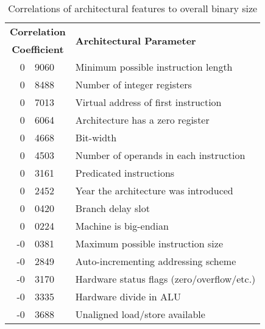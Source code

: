 
\begin{table}[tbp]
\caption{Correlations of architectural features to overall binary size}
\label{table:overall_correlations}
\begin{sf} 
\begin{center}
\begin{tabular}{|r@{.\hspace{0.025em}}l|l|}
\hline
\multicolumn{2}{|c|}{\bf Correlation} & \multirow{2}{*}{\bf Architectural Parameter}\\
\multicolumn{2}{|c|}{\bf Coefficient} & \\
\hline
\hline
 0 & 9060	& Minimum possible instruction length \\
 0 & 8488	& Number of integer registers \\
 0 & 7013	& Virtual address of first instruction \\ 
 0 & 6064	& Architecture has a zero register \\
 0 & 4668	& Bit-width \\
 0 & 4503	& Number of operands in each instruction \\
 0 & 3161	& Predicated instructions \\
 0 & 2452	& Year the architecture was introduced \\
 0 & 0420	& Branch delay slot \\
 0 & 0224	& Machine is big-endian \\
 \hline
-0 & 0381	& Maximum possible instruction size  \\
-0 & 2849	& Auto-incrementing addressing scheme \\
-0 & 3170	& Hardware status flags (zero/overflow/etc.) \\
-0 & 3335	& Hardware divide in ALU \\
-0 & 3688	& Unaligned load/store available \\
\hline
\end{tabular}
\end{center}
\end{sf}
 

%
\end{table}



